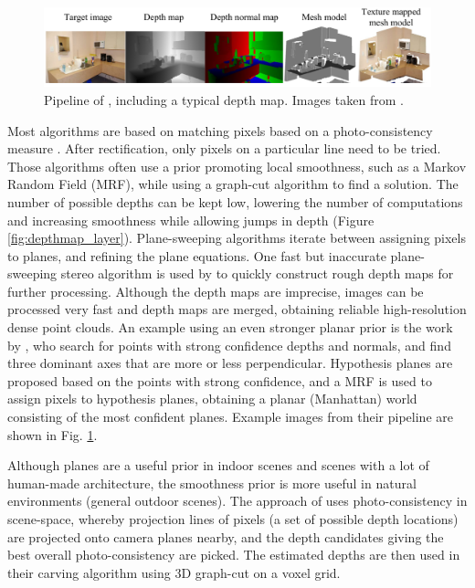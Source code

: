 \begin{figure}[htb!]
 \centering
 \includegraphics[width=1.0\textwidth]{img/depthmap}
 \caption{Pipeline of \FurukawaOld, including a typical depth map. Images taken from \cite{Furukawa2009}.}
 \label{fig:depthmap}
\end{figure}

Most algorithms are based on matching pixels based on a photo-consistency measure \cite{Seitz2006}. After rectification, only pixels on a particular line need to be tried. Those algorithms often use a prior promoting local smoothness, such as a Markov Random Field (MRF), while using a graph-cut algorithm to find a solution. The number of possible depths can be kept low, lowering the number of computations and increasing smoothness while allowing jumps in depth (\eg Figure \ref{fig:depthmap_layer}). Plane-sweeping algorithms iterate between assigning pixels to planes, and refining the plane equations. One fast but inaccurate plane-sweeping stereo algorithm is used by  to quickly construct rough depth maps for further processing. Although the depth maps are imprecise, images can be processed very fast and depth maps are merged, obtaining reliable high-resolution dense point clouds. An example using an even stronger planar prior is the work by \FurukawaOld, who search for points with strong confidence depths and normals, and find three dominant axes that are more or less perpendicular. Hypothesis planes are proposed based on the points with strong confidence, and a MRF is used to assign pixels to hypothesis planes, obtaining a planar (Manhattan) world consisting of the most confident planes. Example images from their pipeline are shown in Fig. \ref{fig:depthmap}.

Although planes are a useful prior in indoor scenes and scenes with a lot of human-made architecture, the smoothness prior is more useful in natural environments (\ie general outdoor scenes). The approach of  uses photo-consistency in scene-space, whereby projection lines of pixels (\ie a set of possible depth locations) are projected onto camera planes nearby, and the depth candidates giving the best overall photo-consistency are picked. The estimated depths are then used in their carving algorithm using 3D graph-cut on a voxel grid.

